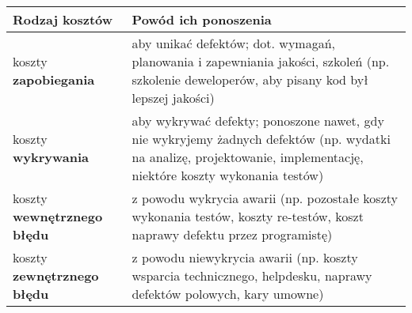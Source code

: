\documentclass[../main.tex]{subfiles}
\begin{document}
    \begin{table}[H]
        \begin{center}
            \begin{tabular}{| p{5cm} || p{11cm} |}
                \hline
                \textbf{Rodzaj kosztów} & \textbf{Powód ich ponoszenia}\\
                \hline
                \hline
                koszty \textbf{zapobiegania} & aby unikać defektów; dot. wymagań, planowania i zapewniania jakości, szkoleń (np. szkolenie deweloperów, aby pisany kod był lepszej jakości)\\
                \hline
                koszty \textbf{wykrywania} & aby wykrywać defekty; ponoszone nawet, gdy nie wykryjemy żadnych defektów (np. wydatki na analizę, projektowanie, implementację, niektóre koszty wykonania testów)\\
                \hline
                koszty \textbf{wewnętrznego błędu} & z powodu wykrycia awarii (np. pozostałe koszty wykonania testów, koszty re-testów, koszt naprawy defektu przez programistę)\\
                \hline
                koszty \textbf{zewnętrznego błędu} & z powodu niewykrycia awarii (np. koszty wsparcia technicznego, helpdesku, naprawy defektów polowych, kary umowne)\\
                \hline
            \end{tabular}
        \end{center}
    \end{table}
\end{document}
